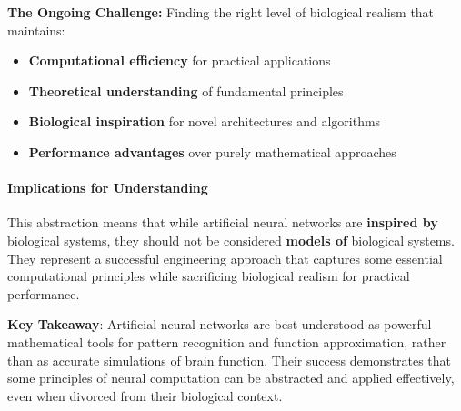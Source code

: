 \textbf{The Ongoing Challenge:}
Finding the right level of biological realism that maintains:

\begin{itemize}
\item \textbf{Computational efficiency} for practical applications
\item \textbf{Theoretical understanding} of fundamental principles
\item \textbf{Biological inspiration} for novel architectures and algorithms
\item \textbf{Performance advantages} over purely mathematical approaches
\end{itemize}

\paragraph{Implications for Understanding}

This abstraction means that while artificial neural networks are \textbf{inspired by} biological systems, they should not be considered \textbf{models of} biological systems. They represent a successful engineering approach that captures some essential computational principles while sacrificing biological realism for practical performance.

\textbf{Key Takeaway}: Artificial neural networks are best understood as powerful mathematical tools for pattern recognition and function approximation, rather than as accurate simulations of brain function. Their success demonstrates that some principles of neural computation can be abstracted and applied effectively, even when divorced from their biological context.